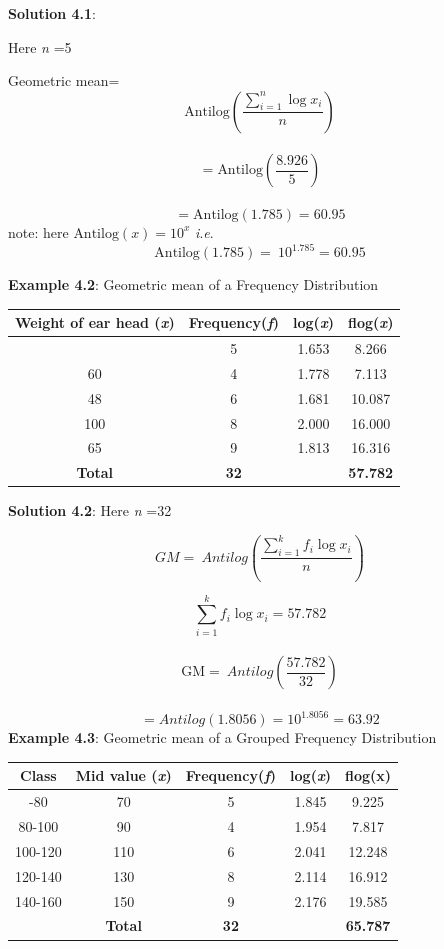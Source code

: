 \documentclass[
]{book}
\begin{document}
\textbf{Solution 4.1}:

Here \emph{n} =5

Geometric mean=\\
\[\text{Antilog}\left( \frac{\sum_{i = 1}^{n}{\log x_{i}}}{n} \right) \]\\
\[=\text{Antilog}\left( \frac{8.926}{5} \right) \]\\
\[ =\text{Antilog}(1.785) = 60.95\] note: here
\(\text{Antilog}\left( x \right) = 10^{x}\) \emph{i}.\emph{e}.
\[\text{Antilog}\left( 1.785 \right) = \ 10^{1.785} = 60.95\]

\textbf{Example 4.2}: Geometric mean of a Frequency Distribution

\begin{longtable}[]{@{}cccc@{}}
\toprule\noalign{}
Weight of ear head (\emph{x}) & Frequency(\emph{f}) & log(\emph{x}) & flog(\emph{x}) \\
\midrule\noalign{}
\endhead
\bottomrule\noalign{}
\endlastfoot
45 & 5 & 1.653 & 8.266 \\
60 & 4 & 1.778 & 7.113 \\
48 & 6 & 1.681 & 10.087 \\
100 & 8 & 2.000 & 16.000 \\
65 & 9 & 1.813 & 16.316 \\
\textbf{Total} & \textbf{32} & & \textbf{57.782} \\
\end{longtable}

\textbf{Solution 4.2}: Here \emph{n} =32

\[GM = \ Antilog\left( \frac{\sum_{i = 1}^{k}{{f_{i}\log}x_{i}}}{n} \right)\]

\[{\sum_{i = 1}^{k}{{f_{i}\log}x_{i}} = 57.782
}\]\\
\[{\text{GM} = \ Antilog\left( \frac{57.782}{32} \right)  }\]\\
\[{= Antilog\left( 1.8056 \right)= 10^{1.8056} = 63.92}\] \textbf{Example
4.3}: Geometric mean of a Grouped Frequency Distribution

\begin{longtable}[]{@{}ccccc@{}}
\toprule\noalign{}
Class & Mid value (\emph{x}) & Frequency(\emph{f}) & log(\emph{x}) & flog(x) \\
\midrule\noalign{}
\endhead
\bottomrule\noalign{}
\endlastfoot
60-80 & 70 & 5 & 1.845 & 9.225 \\
80-100 & 90 & 4 & 1.954 & 7.817 \\
100-120 & 110 & 6 & 2.041 & 12.248 \\
120-140 & 130 & 8 & 2.114 & 16.912 \\
140-160 & 150 & 9 & 2.176 & 19.585 \\
& \textbf{Total} & \textbf{32} & & \textbf{65.787} \\
\end{longtable}
\end{document}
